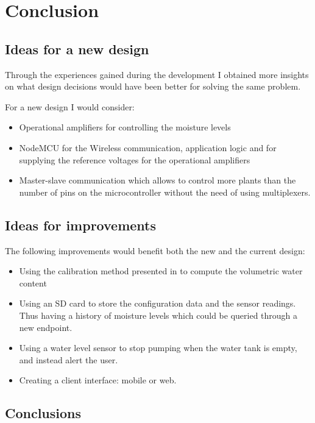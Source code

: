 \chapter{Conclusion}




\section{Ideas for a new design}

Through the experiences gained during the development I obtained more insights on what design decisions would have been better for solving the same problem.

For a new design I would consider:

\begin{itemize}
 \item Operational amplifiers for controlling the moisture levels
 \item NodeMCU for the Wireless communication, application logic and for supplying the reference voltages for the operational amplifiers
 \item Master-slave communication which allows to control more plants than the number of pins on the microcontroller without the need of using multiplexers.
\end{itemize}


\section{Ideas for improvements}

The following improvements would benefit both the new and the current design:

\begin{itemize}
 \item Using the calibration method presented in \cite{Hrisko20} to compute the volumetric water content
 \item Using an SD card to store the configuration data and the sensor readings. Thus having a history of moisture levels which could be queried through a new endpoint.
 \item Using a water level sensor to stop pumping when the water tank is empty, and instead alert the user.
 \item Creating a client interface: mobile or web.
\end{itemize}


\section{Conclusions}

